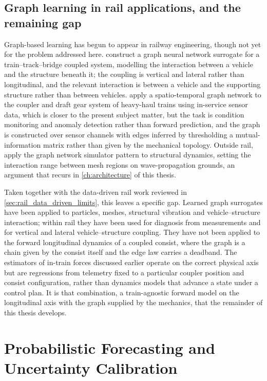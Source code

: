 \subsection{Graph learning in rail applications, and the remaining gap}
\label{sec:graph_rail_gap}

Graph-based learning has begun to appear in railway engineering, though not yet for the problem addressed here. \cite{shao2025ttbgnn} construct a graph neural network surrogate for a train--track--bridge coupled system, modelling the interaction between a vehicle and the structure beneath it; the coupling is vertical and lateral rather than longitudinal, and the relevant interaction is between a vehicle and the supporting structure rather than between vehicles. \cite{zhao2026coupler} apply a spatio-temporal graph network to the coupler and draft gear system of heavy-haul trains using in-service sensor data, which is closer to the present subject matter, but the task is condition monitoring and anomaly detection rather than forward prediction, and the graph is constructed over sensor channels with edges inferred by thresholding a mutual-information matrix rather than given by the mechanical topology. Outside rail, \cite{lucchetti2025gnss} apply the graph network simulator pattern to structural dynamics, setting the interaction range between mesh regions on wave-propagation grounds, an argument that recurs in \cref{ch:architecture} of this thesis.

Taken together with the data-driven rail work reviewed in \cref{sec:rail_data_driven_limits}, this leaves a specific gap. Learned graph surrogates have been applied to particles, meshes, structural vibration and vehicle--structure interaction; within rail they have been used for diagnosis from measurements and for vertical and lateral vehicle--structure coupling. They have not been applied to the forward longitudinal dynamics of a coupled consist, where the graph is a chain given by the consist itself and the edge law carries a deadband. The estimators of in-train forces discussed earlier operate on the correct physical axis but are regressions from telemetry fixed to a particular coupler position and consist configuration, rather than dynamics models that advance a state under a control plan. It is that combination, a train-agnostic forward model on the longitudinal axis with the graph supplied by the mechanics, that the remainder of this thesis develops.


\section{Probabilistic Forecasting and Uncertainty Calibration}

